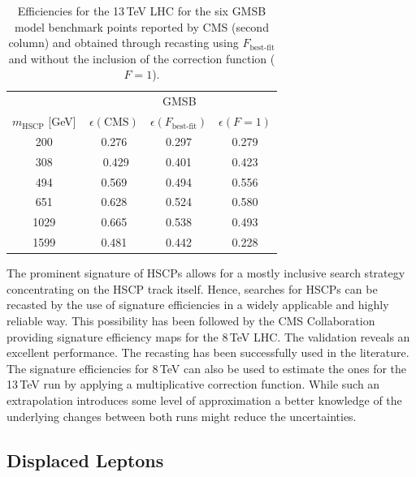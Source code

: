 \begin{table}[h]
\footnotesize
 \renewcommand{\arraystretch}{0.5}
 \begin{center}
\begin{tabular}{c|ccc}
 & \multicolumn{3}{c}{ GMSB } \\
$m_\text{HSCP}$ [{\rm GeV}] & \,$\epsilon(\text{CMS})$ & $\epsilon(F_\text{best-fit})$& $\epsilon(F=1)$ \\
\hline
200     &\,0.276   & 0.297  & 0.279 \\
308   & \, 0.429 &  0.401 & 0.423  \\
494    & \,0.569 & 0.494 & 0.556  \\ 
651  &  \,0.628 & 0.524 & 0.580 \\
1029 &\,0.665  & 0.538  & 0.493\\
1599 &  \,0.481  & 0.442  & 0.228 \\
\hline
\end{tabular} 
\end{center}
\caption{Efficiencies for the 13\,TeV LHC for the six GMSB model benchmark
points reported by CMS (second column)
and obtained through recasting using $F_\text{best-fit}$ and without the inclusion of the correction function ($F=1$).}
\label{tab:effGMSB}
\end{table}

\vskip 0.1in
\vskip 0.1in
The prominent signature of HSCPs allows for a mostly inclusive search strategy concentrating
on the HSCP track itself. Hence, searches for HSCPs can be recasted by the use of signature 
efficiencies in a widely applicable and highly reliable way. This possibility has been followed 
by the CMS Collaboration providing signature 
efficiency maps for the 8\,TeV LHC\@. The validation reveals an excellent performance. The
recasting has been successfully used in the literature.
The signature efficiencies for 8\,TeV can also be used to estimate the ones for the 13\,TeV run by applying
a multiplicative correction function. While such an extrapolation introduces some level of approximation
a better knowledge of the underlying changes between both runs might reduce the uncertainties.


\subsection{Displaced Leptons} 
\label{sec:ch5-displacedLeptons}

